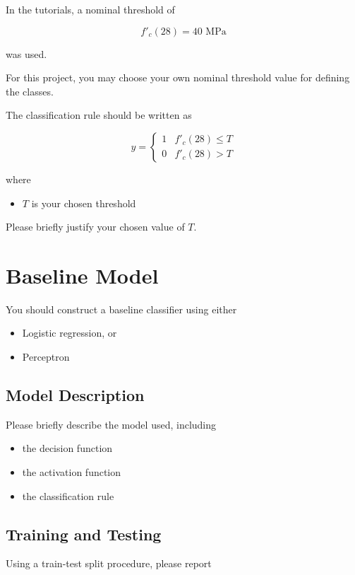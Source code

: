 \documentclass[12pt]{article}
\begin{document}
In the tutorials, a nominal threshold of

\[
f'_c(28) = 40 \text{ MPa}
\]

was used.

For this project, you may choose your own nominal threshold value for defining the classes.

The classification rule should be written as

\[
y =
\begin{cases}
1 & f'_c(28) \le T \\
0 & f'_c(28) > T
\end{cases}
\]

where

\begin{itemize}
\item $T$ is your chosen threshold
\end{itemize}

Please briefly justify your chosen value of $T$.

\section{Baseline Model}

You should construct a baseline classifier using either

\begin{itemize}
\item Logistic regression, or
\item Perceptron
\end{itemize}

\subsection{Model Description}

Please briefly describe the model used, including

\begin{itemize}
\item the decision function
\item the activation function
\item the classification rule
\end{itemize}

\subsection{Training and Testing}

Using a train-test split procedure, please report
\end{document}

